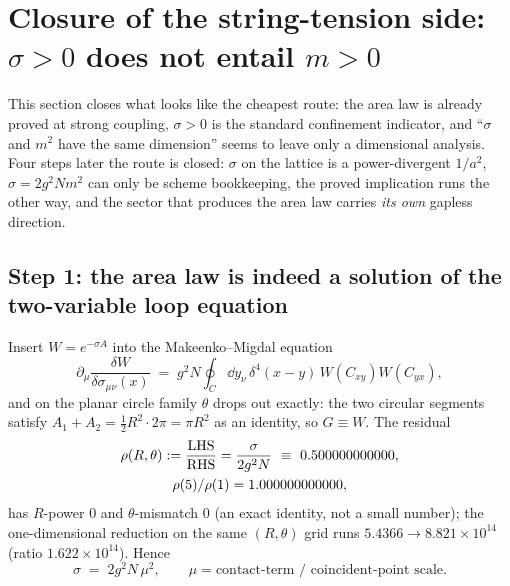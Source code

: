 \section{Closure of the string-tension side: $\sigma>0$ does not entail $m>0$}
\label{sec:tension}

This section closes what looks like the cheapest route: the area law is already proved at strong
coupling, $\sigma>0$ is the standard confinement indicator, and ``$\sigma$ and $m^{2}$ have the same
dimension'' seems to leave only a dimensional analysis. Four steps later the route is closed:
$\sigma$ on the lattice is a power-divergent $1/a^{2}$, $\sigma=2g^{2}Nm^{2}$ can only be scheme
bookkeeping, the proved implication runs the other way, and the sector that produces the area law
carries \emph{its own} gapless direction.

\subsection{Step 1: the area law is indeed a solution of the two-variable loop equation}

Insert $W=e^{-\sigma A}$ into the Makeenko--Migdal equation
\begin{equation}
  \partial_\mu\frac{\delta W}{\delta\sigma_{\mu\nu}(x)}
  \;=\; g^{2}N\oint_{C}\dd y_\nu\,\delta^{4}(x-y)\,W(C_{xy})W(C_{yx}),
  \label{eq:MM}
\end{equation}
and on the planar circle family $\theta$ drops out exactly: the two circular segments satisfy
$A_1+A_2=\tfrac12R^{2}\cdot2\pi=\pi R^{2}$ as an identity, so $G\equiv W$. The residual
\begin{gather}
  \rho(R,\theta):=\frac{\text{LHS}}{\text{RHS}}=\frac{\sigma}{2g^{2}N}
  \ \equiv\ 0.500000000000 ,\notag\\
  \rho(5)/\rho(1)=1.000000000000 ,\notag
\end{gather}
has $R$-power $0$ and $\theta$-mismatch $0$ (an exact identity, not a small number); the
one-dimensional reduction on the same $(R,\theta)$ grid runs $5.4366\to8.821\times10^{14}$ (ratio
$1.622\times10^{14}$). Hence \LT
\begin{equation}
  \sigma \;=\; 2g^{2}N\,\mu^{2},
  \qquad \mu = \text{contact-term / coincident-point scale}.
  \label{eq:sigma-mu}
\end{equation}


